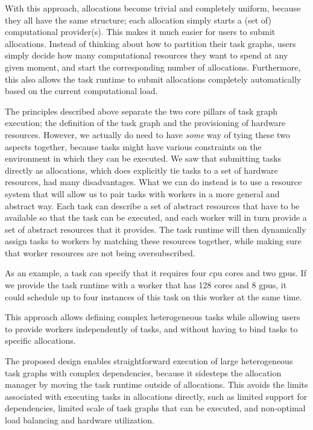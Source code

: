\begin{description}[wide=0pt]
		With this approach, allocations become trivial and completely uniform, because they all have the
		same structure; each allocation simply starts a (set of) computational provider(s). This makes it
		much easier for users to submit allocations. Instead of thinking about how to partition their task
		graphs, users simply decide how many computational resources they want to spend at any given
		moment, and start the corresponding number of allocations. Furthermore, this also allows the task
		runtime to submit allocations completely automatically based on the current computational load.
	\item[Pair tasks with workers using abstract resources] The principles described above separate the two core pillars of task graph execution; the
		definition of the task graph and the provisioning of hardware resources. However, we actually do
		need to have \emph{some} way of tying these two aspects together, because tasks might
		have various constraints on the environment in which they can be executed. We saw that submitting
		tasks directly as allocations, which does explicitly tie tasks to a set of hardware resources, had
		many disadvantages. What we can do instead is to use a resource system that will allow us to pair
		tasks with workers in a more general and abstract way. Each task can describe a set of abstract
		resources that have to be available so that the task can be executed, and each worker will in turn
		provide a set of abstract resources that it provides. The task runtime will then dynamically assign
		tasks to workers by matching these resources together, while making sure that worker resources are
		not being oversubscribed.

		As an example, a task can specify that it requires four \gls{cpu} cores and two
		\glspl{gpu}. If we provide the task runtime with a worker that has 128 cores and 8
		\glspl{gpu}, it could schedule up to four instances of this task on this worker at the
		same time.

		This approach allows defining complex heterogeneous tasks while allowing users to provide workers
		independently of tasks, and without having to bind tasks to specific allocations.
\end{description}

The proposed design enables straightforward execution of large heterogeneous task graphs with
complex dependencies, because it sidesteps the allocation manager by moving the task runtime
outside of allocations. This avoids the limits associated with executing tasks in allocations
directly, such as limited support for dependencies, limited scale of task graphs that can be
executed, and non-optimal load balancing and hardware utilization.

